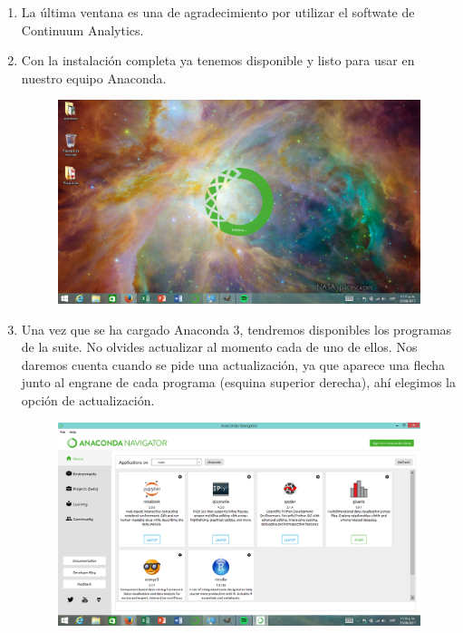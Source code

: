 \documentclass[12pt]{article}
\begin{document}
\begin{enumerate}
\item La última ventana es una de agradecimiento por utilizar el softwate de Continuum Analytics.
\item Con la instalación completa ya tenemos disponible y listo para usar en nuestro equipo Anaconda.
\begin{figure}[H]
	\centering
	\includegraphics[scale=0.25]{Imagenes/Instalacion_Anaconda_Windows_11} 
\end{figure}
\item Una vez que se ha cargado Anaconda 3, tendremos disponibles los programas de la suite. No olvides actualizar al momento cada de uno de ellos. Nos daremos cuenta cuando se pide una actualización, ya que aparece una flecha junto al engrane de cada programa (esquina superior derecha), ahí elegimos la opción de actualización.
\begin{figure}[H]
	\centering
	\includegraphics[scale=0.25]{Imagenes/Instalacion_Anaconda_Windows_12} 
\end{figure}
\end{enumerate}
\end{document}
